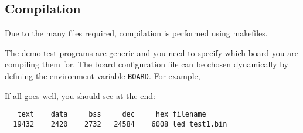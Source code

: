 \begin{Shaded}
\begin{Highlighting}[]
\CommentTok{*/}


\NormalTok{)}
\NormalTok{\{}
\NormalTok{\};}
\NormalTok{\};}


\NormalTok{);}

    \NormalTok{ (}\NormalTok{)}
\NormalTok{    \{}
\NormalTok{    \}}
\NormalTok{\}}
\end{Highlighting}
\end{Shaded}

\subsection{Compilation}
\label{compilation}

Due to the many files required, compilation is performed using
makefiles.

The demo test programs are generic and you need to specify which board
you are compiling them for. The board configuration file can be chosen
dynamically by defining the environment variable \texttt{BOARD}. For
example,

\begin{Shaded}
\begin{Highlighting}[]
\NormalTok{$ }
\NormalTok{$ }
\end{Highlighting}
\end{Shaded}

If all goes well, you should see at the end:

\begin{verbatim}
   text    data     bss     dec     hex filename
  19432    2420    2732   24584    6008 led_test1.bin
\end{verbatim}

